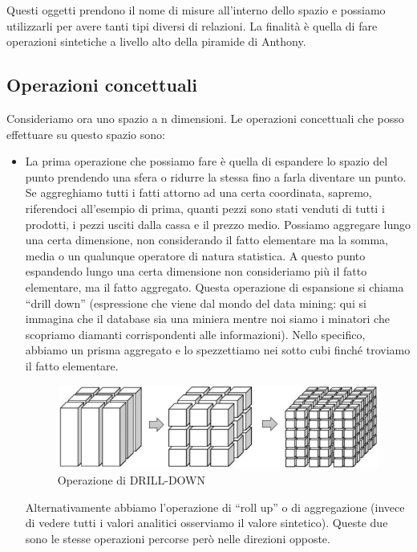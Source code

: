 Questi oggetti prendono il nome di misure all’interno dello spazio e possiamo utilizzarli per avere tanti tipi diversi di relazioni. La finalità è quella di fare operazioni sintetiche a livello alto della piramide di Anthony. 


\subsection{Operazioni concettuali}

Consideriamo ora uno spazio a n dimensioni. Le operazioni concettuali che posso effettuare su questo spazio sono: 

\begin{itemize}

\item La prima operazione che possiamo fare è quella di espandere lo spazio del punto prendendo una sfera o ridurre la stessa fino a farla diventare un punto. Se aggreghiamo tutti i fatti attorno ad una certa coordinata, sapremo, riferendoci all’esempio di prima, quanti pezzi sono stati venduti di tutti i prodotti, i pezzi usciti dalla cassa e il prezzo medio. Possiamo aggregare lungo una certa dimensione, non considerando il fatto elementare ma la somma, media o un qualunque operatore di natura statistica. A questo punto espandendo lungo una 
certa dimensione non consideriamo più il fatto elementare, ma il fatto aggregato. Questa 
operazione di espansione si chiama “drill down” (espressione che viene dal mondo del data mining: qui si immagina che il database sia una miniera mentre noi siamo i minatori che scopriamo diamanti corrispondenti alle informazioni). Nello specifico, abbiamo un prisma aggregato e lo spezzettiamo nei sotto cubi finché troviamo il fatto elementare. 

\begin{center}
\begin{figure}[H]
\centering
\includegraphics[scale=1]{figures/drill_down.png}
\caption{Operazione di DRILL-DOWN}
\end{figure}
\end{center}

Alternativamente abbiamo l’operazione di “roll up” o di aggregazione (invece di vedere tutti i valori analitici osserviamo il valore sintetico). Queste due sono le stesse operazioni percorse però nelle direzioni opposte. 


\end{itemize}
